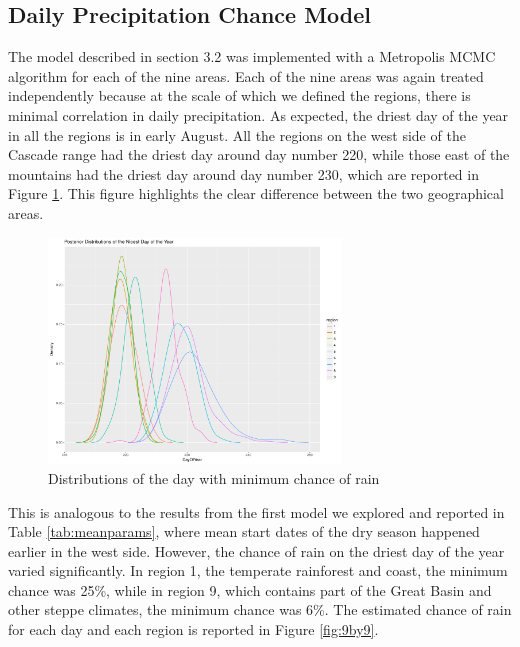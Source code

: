 \documentclass{article}
\begin{document}
\subsection{Daily Precipitation Chance Model}

The model described in section 3.2 was implemented with a Metropolis MCMC algorithm for each of the nine areas.  Each of the nine areas was again treated independently because at the scale of which we defined the regions, there is minimal correlation in daily precipitation.  As expected, the driest day of the year in all the regions is in early August. All the regions on the west side of the Cascade range had the driest day around day number 220, while those east of the mountains had the driest day around day number 230, which are reported in Figure \ref{fig:driestDist}. This figure highlights the clear difference between the two geographical areas.
\begin{figure}[H]
\centering
\includegraphics[width = .4\textwidth, height = 6cm]{NicestDayOfYear}
\caption{Distributions of the day with minimum chance of rain}
\label{fig:driestDist}
\end{figure}
This is analogous to the results from the first model we explored and reported in Table \ref{tab:meanparams}, where mean start dates of the dry season happened earlier in the west side.
However, the chance of rain on the driest day of the year varied significantly. In region 1, the temperate rainforest and coast, the minimum chance was 25\%, while in region 9, which contains part of the Great Basin and other steppe climates, the minimum chance was 6\%. The estimated chance of rain for each day and each region is reported in Figure \ref{fig:9by9}.
\end{document}
